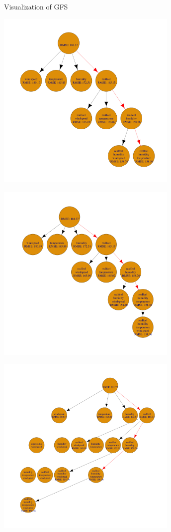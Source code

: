 \documentclass[11pt,compress,t,notes=noshow, xcolor=table]{beamer}
\begin{document}
\begin{vbframe}{Visualization of GFS}
      \begin{center}
      \includegraphics[width = 0.65\textwidth]{figure/fs-wrappers-powerset-tree-3.png}
      \end{center}
  
      \framebreak
  
      \begin{center}
      \includegraphics[width = 0.65\textwidth]{figure/fs-wrappers-powerset-tree-4.png}
      \end{center}
  
      \framebreak

    \begin{center}
    \includegraphics[width = 0.65\textwidth]{figure/fs-wrappers-powerset-all-4.png}
    \end{center}


\end{vbframe}
\end{document}
